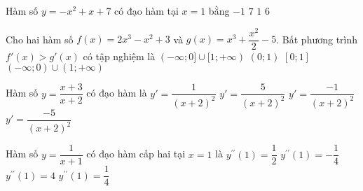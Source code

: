 \begin{ex}%
	Hàm số $y=-x^2+x+7$ có đạo hàm tại $x=1$ bằng
	\choice
	{\True $-1$}
	{$7$} 
	{$1$}
	{$6$}
\end{ex}
\begin{ex}%
	Cho hai hàm số $f(x)=2 x^3-x^2+3$ và $g(x)=x^3+\dfrac{x^2}{2}-5$.
	Bất phương trình $f'(x)>g'(x)$ có tập nghiệm là
	\choice
	{$(-\infty ; 0] \cup[1 ;+\infty)$}
	{$(0 ; 1)$}
	{$[0 ; 1]$}
	{\True $(-\infty ; 0) \cup(1 ;+\infty)$}
\end{ex}
\begin{ex}%
	Hàm số $y=\dfrac{x+3}{x+2}$ có đạo hàm là
	\choice
	{$y'=\dfrac{1}{(x+2)^2}$}
	{$y'=\dfrac{5}{(x+2)^2}$}
	{\True $y'=\dfrac{-1}{(x+2)^2}$}
	{$y'=\dfrac{-5}{(x+2)^2}$}
\end{ex}
\begin{ex}%
	Hàm số $y=\dfrac{1}{x+1}$ có đạo hàm cấp hai tại $x=1$ là
	\choice
	{$y^{\prime \prime}(1)=\dfrac{1}{2}$}
	{$y^{\prime \prime}(1)=-\dfrac{1}{4}$}
	{$y^{\prime \prime}(1)=4$}
	{\True $y^{\prime \prime}(1)=\dfrac{1}{4}$}
\end{ex}
